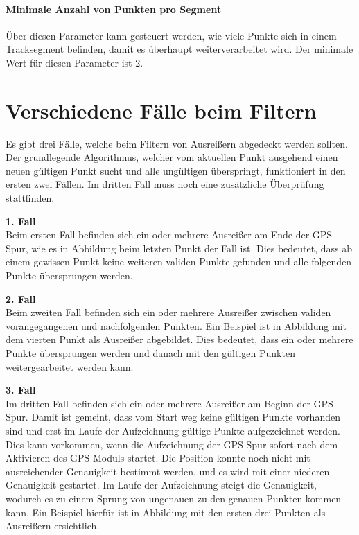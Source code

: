 \paragraph{Minimale Anzahl von Punkten pro Segment} Über diesen Parameter kann gesteuert werden, wie viele Punkte sich in einem Tracksegment befinden, damit es überhaupt weiterverarbeitet wird. Der minimale Wert für diesen Parameter ist 2. 

\section*{Verschiedene Fälle beim Filtern}
Es gibt drei Fälle, welche beim Filtern von Ausreißern abgedeckt werden sollten. Der grundlegende Algorithmus, welcher vom aktuellen Punkt ausgehend einen neuen gültigen Punkt sucht und alle ungültigen überspringt, funktioniert in den ersten zwei Fällen. Im dritten Fall muss noch eine zusätzliche Überprüfung stattfinden.

\textbf{1. Fall}\\
Beim ersten Fall befinden sich ein oder mehrere Ausreißer am Ende der GPS-Spur, wie es in Abbildung  beim letzten Punkt der Fall ist. Dies bedeutet, dass ab einem gewissen Punkt keine weiteren validen Punkte gefunden und alle folgenden Punkte übersprungen werden.


\textbf{2. Fall}\\
Beim zweiten Fall befinden sich ein oder mehrere Ausreißer zwischen validen vorangegangenen und nachfolgenden Punkten. Ein Beispiel ist in Abbildung  mit dem vierten Punkt als Ausreißer abgebildet. Dies bedeutet, dass ein oder mehrere Punkte übersprungen werden und danach mit den gültigen Punkten weitergearbeitet werden kann.


\textbf{3. Fall}\\
Im dritten Fall befinden sich ein oder mehrere Ausreißer am Beginn der GPS-Spur. Damit ist gemeint, dass vom Start weg keine gültigen Punkte vorhanden sind und erst im Laufe der Aufzeichnung gültige Punkte aufgezeichnet werden. Dies kann vorkommen, wenn die Aufzeichnung der GPS-Spur sofort nach dem Aktivieren des GPS-Moduls startet. Die Position konnte noch nicht mit ausreichender Genauigkeit bestimmt werden, und es wird mit einer niederen Genauigkeit gestartet. Im Laufe der Aufzeichnung steigt die Genauigkeit, wodurch es zu einem Sprung von ungenauen zu den genauen Punkten kommen kann. Ein Beispiel hierfür ist in Abbildung  mit den ersten drei Punkten als Ausreißern ersichtlich.

